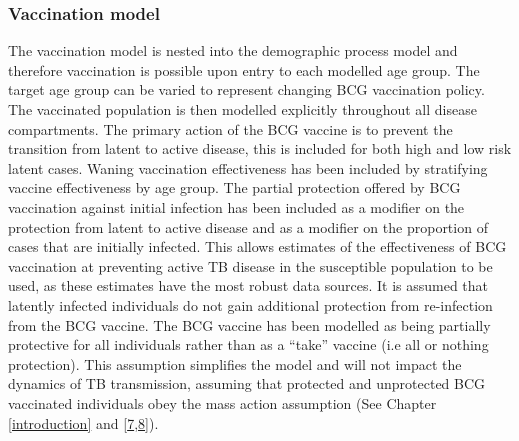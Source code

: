 \documentclass[11pt,twoside]{bristolthesis}
\begin{document}
  \hypertarget{vaccination-model}{%
  \subsubsection{Vaccination model}\label{vaccination-model}}
  
  The vaccination model is nested into the demographic process model and therefore vaccination is possible upon entry to each modelled age group. The target age group can be varied to represent changing BCG vaccination policy. The vaccinated population is then modelled explicitly throughout all disease compartments. The primary action of the BCG vaccine is to prevent the transition from latent to active disease, this is included for both high and low risk latent cases. Waning vaccination effectiveness has been included by stratifying vaccine effectiveness by age group. The partial protection offered by BCG vaccination against initial infection has been included as a modifier on the protection from latent to active disease and as a modifier on the proportion of cases that are initially infected. This allows estimates of the effectiveness of BCG vaccination at preventing active TB disease in the susceptible population to be used, as these estimates have the most robust data sources. It is assumed that latently infected individuals do not gain additional protection from re-infection from the BCG vaccine. The BCG vaccine has been modelled as being partially protective for all individuals rather than as a ``take'' vaccine (i.e all or nothing protection). This assumption simplifies the model and will not impact the dynamics of TB transmission, assuming that protected and unprotected BCG vaccinated individuals obey the mass action assumption (See Chapter \ref{introduction} and {[}\protect\hyperlink{ref-Anderson1991}{7},\protect\hyperlink{ref-Keeling2007}{8}{]}).
  
\end{document}
